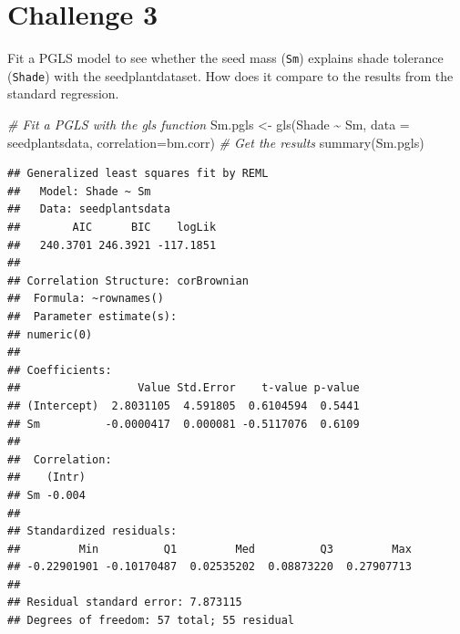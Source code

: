 \documentclass[
]{book}
\newenvironment{Shaded}{\begin{snugshade}}{\end{snugshade}}
\newcommand{\AttributeTok}[1]{\textcolor[rgb]{0.77,0.63,0.00}{#1}}
\newcommand{\CommentTok}[1]{\textcolor[rgb]{0.56,0.35,0.01}{\textit{#1}}}
\newcommand{\FunctionTok}[1]{\textcolor[rgb]{0.00,0.00,0.00}{#1}}
\newcommand{\NormalTok}[1]{#1}
\newcommand{\OtherTok}[1]{\textcolor[rgb]{0.56,0.35,0.01}{#1}}
\newcommand{\SpecialCharTok}[1]{\textcolor[rgb]{0.00,0.00,0.00}{#1}}
\begin{document}
\hypertarget{challenge-3-1}{%
\section{Challenge 3}\label{challenge-3-1}}

Fit a PGLS model to see whether the seed mass (\texttt{Sm}) explains shade tolerance (\texttt{Shade}) with the seedplantdataset. How does it compare to the results from the standard regression.

\begin{Shaded}
\begin{Highlighting}[]
\CommentTok{\# Fit a PGLS with the gls function}
\NormalTok{Sm.pgls }\OtherTok{\textless{}{-}} \FunctionTok{gls}\NormalTok{(Shade }\SpecialCharTok{\textasciitilde{}}\NormalTok{ Sm, }\AttributeTok{data =}\NormalTok{ seedplantsdata, }\AttributeTok{correlation=}\NormalTok{bm.corr)}
\CommentTok{\# Get the results}
\FunctionTok{summary}\NormalTok{(Sm.pgls)}
\end{Highlighting}
\end{Shaded}

\begin{verbatim}
## Generalized least squares fit by REML
##   Model: Shade ~ Sm 
##   Data: seedplantsdata 
##        AIC      BIC    logLik
##   240.3701 246.3921 -117.1851
## 
## Correlation Structure: corBrownian
##  Formula: ~rownames() 
##  Parameter estimate(s):
## numeric(0)
## 
## Coefficients:
##                  Value Std.Error    t-value p-value
## (Intercept)  2.8031105  4.591805  0.6104594  0.5441
## Sm          -0.0000417  0.000081 -0.5117076  0.6109
## 
##  Correlation: 
##    (Intr)
## Sm -0.004
## 
## Standardized residuals:
##         Min          Q1         Med          Q3         Max 
## -0.22901901 -0.10170487  0.02535202  0.08873220  0.27907713 
## 
## Residual standard error: 7.873115 
## Degrees of freedom: 57 total; 55 residual
\end{verbatim}
\end{document}
